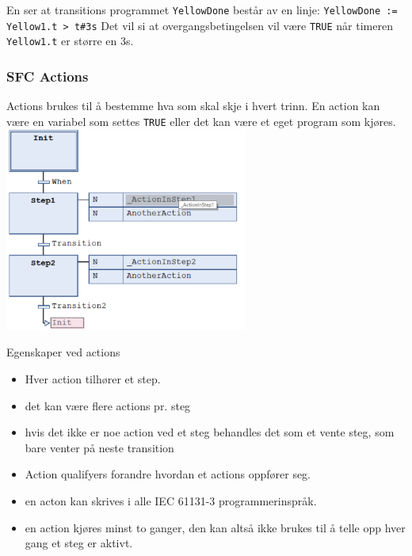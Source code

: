 \vskip 5pt 
En ser at transitions programmet \verb|YellowDone| består av en linje:
\vskip 2.5pt 
\verb|YellowDone := Yellow1.t > t#3s|
\vskip 2.5pt 
Det vil si at overgangsbetingelsen vil være \verb|TRUE| når timeren \verb|Yellow1.t| er større en 3s. 
\subsubsection{SFC Actions}
Actions brukes til å bestemme hva som skal skje i hvert trinn. En action kan være en variabel som settes \verb|TRUE| eller det kan være et eget program som kjøres. 
\includegraphics[width=0.6\textwidth]{SFC15.png}

Egenskaper ved actions
\begin{itemize}
\item Hver action tilhører et step. 
\item det kan være flere actions pr. steg
\item hvis det ikke er noe action ved et steg behandles det som et vente
steg, som bare venter på neste transition
\item Action qualifyers forandre hvordan et actions oppfører seg. 
\item en acton kan skrives i alle IEC 61131-3 programmerinspråk. 
\item en action kjøres minst to ganger, den kan altså ikke brukes til å telle opp hver gang et steg er aktivt. 
\end{itemize}

